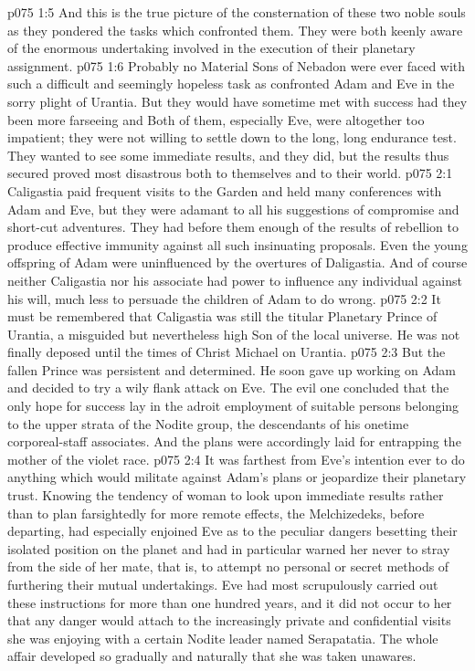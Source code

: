 \vs p075 1:5 And this is the true picture of the consternation of these two noble souls as they pondered the tasks which confronted them. They were both keenly aware of the enormous undertaking involved in the execution of their planetary assignment.
\vs p075 1:6 Probably no Material Sons of Nebadon were ever faced with such a difficult and seemingly hopeless task as confronted Adam and Eve in the sorry plight of Urantia. But they would have sometime met with success had they been more farseeing and  Both of them, especially Eve, were altogether too impatient; they were not willing to settle down to the long, long endurance test. They wanted to see some immediate results, and they did, but the results thus secured proved most disastrous both to themselves and to their world.
\vs p075 2:1 Caligastia paid frequent visits to the Garden and held many conferences with Adam and Eve, but they were adamant to all his suggestions of compromise and short\hyp{}cut adventures. They had before them enough of the results of rebellion to produce effective immunity against all such insinuating proposals. Even the young offspring of Adam were uninfluenced by the overtures of Daligastia. And of course neither Caligastia nor his associate had power to influence any individual against his will, much less to persuade the children of Adam to do wrong.
\vs p075 2:2 It must be remembered that Caligastia was still the titular Planetary Prince of Urantia, a misguided but nevertheless high Son of the local universe. He was not finally deposed until the times of Christ Michael on Urantia.
\vs p075 2:3 But the fallen Prince was persistent and determined. He soon gave up working on Adam and decided to try a wily flank attack on Eve. The evil one concluded that the only hope for success lay in the adroit employment of suitable persons belonging to the upper strata of the Nodite group, the descendants of his onetime corporeal\hyp{}staff associates. And the plans were accordingly laid for entrapping the mother of the violet race.
\vs p075 2:4 \pc It was farthest from Eve’s intention ever to do anything which would militate against Adam’s plans or jeopardize their planetary trust. Knowing the tendency of woman to look upon immediate results rather than to plan farsightedly for more remote effects, the Melchizedeks, before departing, had especially enjoined Eve as to the peculiar dangers besetting their isolated position on the planet and had in particular warned her never to stray from the side of her mate, that is, to attempt no personal or secret methods of furthering their mutual undertakings. Eve had most scrupulously carried out these instructions for more than one hundred years, and it did not occur to her that any danger would attach to the increasingly private and confidential visits she was enjoying with a certain Nodite leader named Serapatatia. The whole affair developed so gradually and naturally that she was taken unawares.
